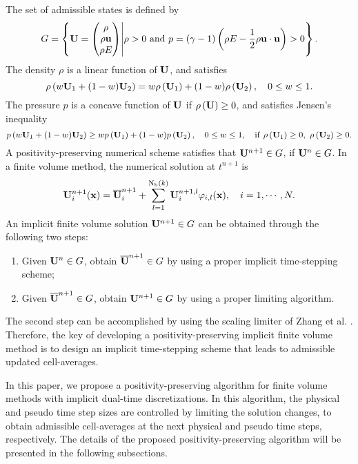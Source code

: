 The set of admissible states is defined by
\begin{equation}
    G= \left\{\mathbf{U} =  \begin{pmatrix}
        \rho \\ \rho \mathbf{u} \\ \rho E
    \end{pmatrix} \middle| \rho>0 \ \mathrm{and} \ p=
    \left(\gamma-1\right) \left(\rho E - \dfrac{1}{2} \rho \mathbf{u} \cdot \mathbf{u}\right) >0 \right\}.
\end{equation}
The density $\rho$ is a linear function of $\mathbf{U}$, and satisfies
\begin{equation}
    \label{eq:density-linear}
    \rho\left(w\mathbf{U}_1+(1-w)\mathbf{U}_2\right) = w\rho\left(\mathbf{U}_1\right) + (1-w) \rho \left(\mathbf{U}_2\right) , \quad 0 \leq w \leq 1.
\end{equation}
The pressure $p$ is a concave function of $\mathbf{U}$ if $\rho\left(\mathbf{U}\right) \geq 0$, and satisfies Jensen's inequality
\begin{equation}
    \label{eq:pressure-Jensen}
    p \left(w\mathbf{U}_1+(1-w)\mathbf{U}_2\right)  \geq w p\left(\mathbf{U}_1\right) + (1-w) p \left(\mathbf{U}_2\right), \quad 0 \leq w \leq 1, \quad \mathrm{if} \ \rho\left(\mathbf{U}_1\right) \geq 0, \ \rho\left(\mathbf{U}_2\right) \geq 0.
\end{equation}
A positivity-preserving numerical scheme satisfies that $\mathbf{U}^{n+1} \in G$, if $\mathbf{U}^{n} \in G$.  In a finite volume method, the numerical solution at $t^{n+1}$ is
\begin{equation}
    \mathbf{U}^{n+1}_i (\mathbf{x})= \overline{\mathbf{U}}^{n+1}_i + \sum_{l=1}^{\mathrm{N_b}(k)}{\mathbf{U}_i^{n+1,l} \varphi_{i,l}(\mathbf{x}) }, \quad i=1, \cdots,N.
\end{equation}
An implicit finite volume solution $\mathbf{U}^{n+1} \in G$ can be obtained through the following two steps:
\begin{enumerate}[label=(\arabic*)]
    \item Given $\mathbf{U}^n \in G$, obtain $\overline{\mathbf{U}}^{n+1} \in G$ by using a proper implicit time-stepping scheme;
    \item Given $\overline{\mathbf{U}}^{n+1} \in G$, obtain $\mathbf{U}^{n+1} \in G$ by using a proper limiting algorithm.
\end{enumerate}
The second step can be accomplished by using the scaling limiter of Zhang et al. \cite{zhang2010positivity}. Therefore, the key of developing a positivity-preserving implicit finite volume method is to design an implicit time-stepping scheme that leads to admissible updated cell-averages.

In this paper, we propose a positivity-preserving algorithm for finite volume methods with implicit dual-time discretizations. In this algorithm, the physical and pseudo time step sizes are controlled by limiting the solution changes, to obtain admissible cell-averages at the next physical and pseudo time steps, respectively. The details of the proposed positivity-preserving algorithm will be presented in the following subsections.

